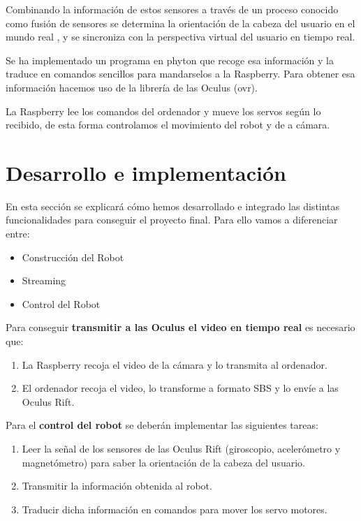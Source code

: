 \documentclass[twoside, 12pt]{epstfg}
\begin{document}
Combinando la información de estos sensores a través de un proceso conocido como fusión de sensores se determina la orientación de la cabeza del usuario en el mundo real , y se sincroniza con la perspectiva virtual del usuario en tiempo real. 

Se ha implementado un programa en phyton que recoge esa información y la traduce en comandos sencillos para mandarselos a la Raspberry. Para obtener esa información hacemos uso de la librería de las Oculus (ovr).

La Raspberry lee los comandos del ordenador y mueve los servos según lo recibido, de esta forma controlamos el movimiento del robot y de a cámara.

\newpage
\chapter{Desarrollo e implementación}


En esta sección se explicará cómo hemos desarrollado e integrado las distintas funcionalidades para conseguir el proyecto final.
Para ello vamos a diferenciar entre:

\begin{itemize}
	\item Construcción del Robot
	\item Streaming 
	\item Control del Robot
\end{itemize}

Para conseguir \textbf{transmitir a las Oculus el video en tiempo real} es necesario que:
\begin{enumerate}
	\item La Raspberry recoja el video de la cámara y lo transmita al ordenador.
	
	\item El ordenador recoja el video, lo transforme a formato SBS y lo envíe a las Oculus Rift. 
	
\end{enumerate}





Para el \textbf{control del robot} se deberán implementar las siguientes tareas:

\begin{enumerate}
	\item Leer la señal de los sensores de las Oculus Rift (giroscopio, acelerómetro y magnetómetro) para saber la orientación de la cabeza del usuario.
	
	\item Transmitir la información obtenida al robot.
	
	\item Traducir dicha información en comandos para mover los servo motores.
\end{enumerate} 
\end{document}
